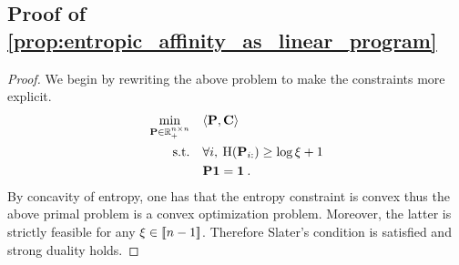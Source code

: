\subsection{Proof of \cref{prop:entropic_affinity_as_linear_program}}

\entropicaffinityaslinearprogram*

\begin{proof}
We begin by rewriting the above problem to make the constraints more explicit.
\begin{align*}
    \min_{\mathbf{P} \in \mathbb{R}_+^{n \times n}} \quad &\langle \mathbf{P}, \mathbf{C} \rangle \\
    \text{s.t.} \quad &\forall i, \: \operatorname{H}(\mathbf{P}_{i:}) \geq \log{\xi} + 1 \\
    & \mathbf{P} \bm{1} = \bm{1} \:.
\end{align*}
By concavity of entropy, one has that the entropy constraint is convex thus the above primal problem is a convex optimization problem. Moreover, the latter is strictly feasible for any $\xi \in {[\![n-1]\!]}$. Therefore Slater's condition is satisfied and strong duality holds.


\end{proof}
